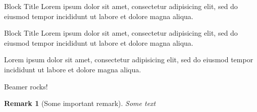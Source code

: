 \documentclass{beamer}
\newtheorem*{remark}{Remark}
\begin{document}

\begin{frame}
    \begin{block}{Block Title}
    Lorem ipsum dolor sit amet, consectetur adipisicing elit, sed do eiusmod tempor incididunt ut labore et dolore magna aliqua.
  \end{block}
  \begin{alertblock}{Block Title}
    Lorem ipsum dolor sit amet, consectetur adipisicing elit, sed do eiusmod tempor incididunt ut labore et dolore magna aliqua.
  \end{alertblock}
  \begin{example}
    Lorem ipsum dolor sit amet, consectetur adipisicing elit, sed do eiusmod tempor incididunt ut labore et dolore magna aliqua.
  \end{example}
\end{frame}


\begin{frame}
  \begin{theorem}
    Beamer rocks!
  \end{theorem}
  \begin{remark}[Some important remark]
    Some text
  \end{remark}
\end{frame}
\end{document}
